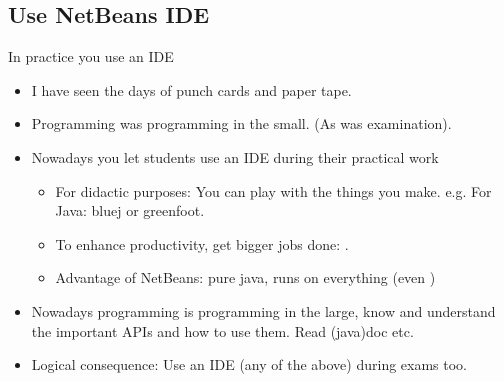 \subsection[Use an IDE]{Use NetBeans IDE}
\begin{frame}{In practice you use an IDE}
  \begin{itemize}
  \item I have seen the days of punch cards and paper tape.
  \item Programming was programming in the small. (As was examination).
  \item Nowadays you let students use an IDE during their practical work
    \begin{itemize}
    \item For didactic purposes: You can play with the things you
      make. e.g. For Java: bluej or greenfoot.
    \item To enhance productivity, get bigger jobs done: .
    \item Advantage of NetBeans: pure java, runs on everything (even
      )
    \end{itemize}
  \item Nowadays programming is programming in the large, know and
    understand the important APIs and how to use them. Read (java)doc etc.
  \item Logical consequence: Use an IDE (any of the above) during
    exams too.
  \end{itemize}
\end{frame}

